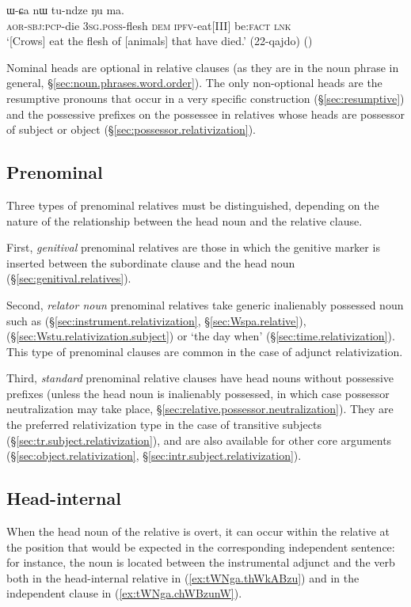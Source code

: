 \begin{exe}
\ex \label{ex:pWkWsi.WCa}
\gll [pɯ-kɯ-si] ɯ-ɕa nɯ tu-ndze ŋu ma. \\
\textsc{aor}-\textsc{sbj}:\textsc{pcp}-die \textsc{3sg}.\textsc{poss}-flesh \textsc{dem} \textsc{ipfv}-eat[III] be:\textsc{fact} \textsc{lnk} \\
\glt `[Crows] eat the flesh of [animals] that have died.' (22-qajdo)
()
\end{exe} 

Nominal heads are optional in relative clauses (as they are in the noun phrase in general, §\ref{sec:noun.phrases.word.order}). The only non-optional heads are the resumptive pronouns that occur in a very specific construction (§\ref{sec:resumptive}) and the possessive prefixes on the possessee in relatives whose heads are possessor of subject or object (§\ref{sec:possessor.relativization}).

\subsection{Prenominal} \label{sec:prenominal.relative}
Three types of prenominal relatives must be distinguished, depending on the nature of the relationship between the head noun and the relative clause.

First, \textit{genitival} prenominal relatives are those in which the genitive marker  is inserted between the subordinate clause and the head noun (§\ref{sec:genitival.relatives}). 
 
Second, \textit{relator noun} prenominal relatives take generic inalienably possessed noun such as  (§\ref{sec:instrument.relativization}, §\ref{sec:Wspa.relative}),  (§\ref{sec:Wstu.relativization.subject}) or  `the day when' (§\ref{sec:time.relativization}). This type of prenominal clauses are common in the case of adjunct relativization. 

Third, \textit{standard} prenominal relative clauses have head nouns without possessive prefixes (unless the head noun is inalienably possessed, in which case possessor neutralization may take place, §\ref{sec:relative.possessor.neutralization}). They are the preferred relativization type in the case of transitive subjects (§\ref{sec:tr.subject.relativization}), and are also available for other core arguments (§\ref{sec:object.relativization}, §\ref{sec:intr.subject.relativization}).

\subsection{Head-internal} \label{sec:head-internal.relative}  
When the head noun of the relative is overt, it can occur within the relative at the position that would be expected in the corresponding independent sentence: for instance, the noun  is located between the instrumental adjunct and the verb both in the head-internal relative in (\ref{ex:tWNga.thWkABzu}) and in the independent clause in (\ref{ex:tWNga.chWBzunW}).

